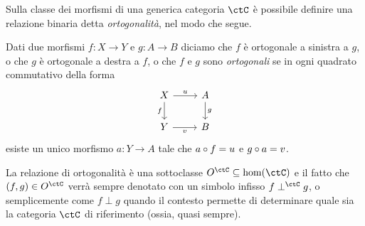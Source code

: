 \medskip
Sulla classe dei morfismi di una generica categoria \(\ctC\) è possibile definire una relazione binaria detta \emph{ortogonalità}, nel modo che segue.
\begin{definition}\label{def_ortogona}
	Dati due morfismi \(f : X\to Y\) e \(g : A\to B\) diciamo che \(f\) è ortogonale a sinistra a \(g\), o che \(g\) è ortogonale a destra a \(f\), o che \(f\) e \(g\) sono \emph{ortogonali} se in ogni quadrato commutativo della forma
	\[
		\begin{tikzcd}
			X \ar[d, "f"']\ar[r, "u"]& A\ar[d, "g"] \\
			Y \ar[r, "v"']& B
		\end{tikzcd}
	\]
	esiste un unico morfismo \(a : Y\to A\) tale che \(a\circ f=u\) e \(g\circ a=v\).
\end{definition}
La relazione di ortogonalità è una sottoclasse \(O^\ctC \subseteq \hom(\ctC)\) e il fatto che \((f,g)\in O^\ctC\) verrà sempre denotato con un simbolo infisso \(f\perp^\ctC g\), o semplicemente come \(f\perp g\) quando il contesto permette di determinare quale sia la categoria \(\ctC\) di riferimento (ossia, quasi sempre).

